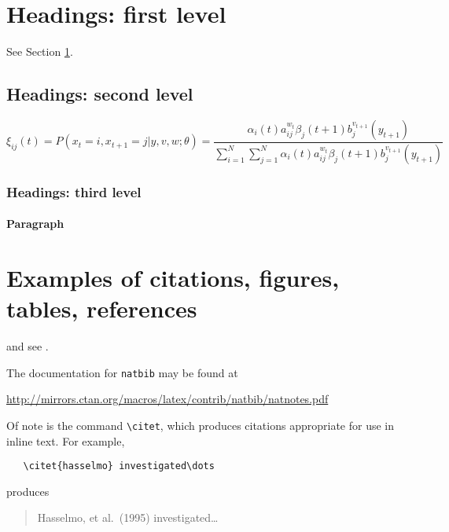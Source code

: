 \documentclass{article}
\begin{document}





\section{Headings: first level}
\label{sec:headings}

\lipsum[4] See Section \ref{sec:headings}.

\subsection{Headings: second level}
\lipsum[5]
\begin{equation}
\xi _{ij}(t)=P(x_{t}=i,x_{t+1}=j|y,v,w;\theta)= {\frac {\alpha _{i}(t)a^{w_t}_{ij}\beta _{j}(t+1)b^{v_{t+1}}_{j}(y_{t+1})}{\sum _{i=1}^{N} \sum _{j=1}^{N} \alpha _{i}(t)a^{w_t}_{ij}\beta _{j}(t+1)b^{v_{t+1}}_{j}(y_{t+1})}}
\end{equation}

\subsubsection{Headings: third level}
\lipsum[6]

\paragraph{Paragraph}
\lipsum[7]

\section{Examples of citations, figures, tables, references}
\label{sec:others}
\lipsum[8] \cite{kour2014real,kour2014fast} and see \cite{hadash2018estimate}.

The documentation for \verb+natbib+ may be found at
\begin{center}
  \url{http://mirrors.ctan.org/macros/latex/contrib/natbib/natnotes.pdf}
\end{center}
Of note is the command \verb+\citet+, which produces citations
appropriate for use in inline text.  For example,
\begin{verbatim}
   \citet{hasselmo} investigated\dots
\end{verbatim}
produces
\begin{quote}
  Hasselmo, et al.\ (1995) investigated\dots
\end{quote}
\end{document}
